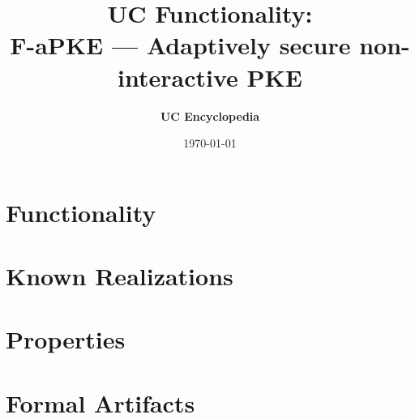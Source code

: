 \documentclass[11pt,a4paper]{article}
\title{\textbf{\Large UC Functionality:}\\[0.2em] \Large F-aPKE --- Adaptively secure non-interactive PKE}
\author{\textbf{UC Encyclopedia}}
\date{\today}
\newtheorem{functionality}{Functionality}
\begin{document}
\maketitle

\begin{abstract}
\end{abstract}

\section{Functionality}

%

\section{Known Realizations}


\section{Properties}


\section{Formal Artifacts}

\end{document}
